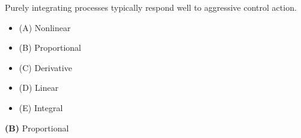 

Purely integrating processes typically respond well to aggressive \underbar{\hskip 50pt} control action.

\begin{itemize}
\item{(A)} Nonlinear
\vskip 5pt 
\item{(B)} Proportional
\vskip 5pt 
\item{(C)} Derivative
\vskip 5pt 
\item{(D)} Linear
\vskip 5pt 
\item{(E)} Integral
\end{itemize}







{\bf (B)} Proportional











